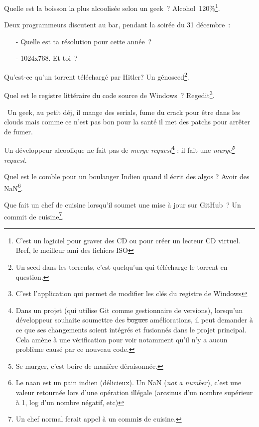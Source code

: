 \documentclass[10pt,a5paper,fullpage]{book}
\begin{document}
\begin{enumerate}
{		\item Quelle est la boisson la plus alcoolisée selon un geek~? Alcohol~120\%\footnote{C’est un logiciel pour graver des CD ou pour créer un lecteur CD virtuel. \\Bref, le meilleur ami des fichiers ISO}.
		\item Deux programmeurs discutent au bar, pendant la soirée du 31 décembre~:
		\begin{itemize}
			\item[-] Quelle est ta résolution pour cette année~?
			\item[-] 1024x768. Et toi~?
		\end{itemize}
		\item Qu'est-ce qu'un torrent téléchargé par Hitler? Un génoseed\footnote{Un seed dans les torrents, c’est quelqu’un qui télécharge le torrent en question.}.
		\item Quel est le registre littéraire du code source de Windows~? Regedit\footnote{C'est l'application qui permet de modifier les clés du registre de Windows}.
		\item \guillemotleft~Un geek, au petit déj, il mange des serials, fume du crack pour être dans les clouds mais comme ce n’est pas bon pour la santé il met des patchs pour arrêter de fumer.~
		\item Un développeur alcoolique ne fait pas de \textit{merge request}\footnote{Dans un projet (qui utilise Git comme gestionnaire de versions), lorsqu'un développeur souhaite soumettre des \sout{bogues} améliorations, il peut demander à ce que ses changements soient intégrés et fusionnés dans le projet principal. Cela amène à une vérification pour voir notamment qu'il n'y a aucun problème causé par ce nouveau code.} : il fait une \textit{murge\footnote{Se murger, c'est boire de manière déraisonnée.} request}.
		\item Quel est le comble pour un boulanger Indien quand il écrit des algos ? Avoir des NaN\footnote{Le naan est un pain indien (délicieux). Un NaN (\textit{not a number}), c'est une valeur retournée lors d'une opération illégale (arcsinus d'un nombre supérieur à 1, log d'un nombre négatif, etc)}.
		\item Que fait un chef de cuisine lorsqu'il soumet une mise à jour sur GitHub~? Un commit de cuisine\footnote{Un chef normal ferait appel à un commi\textbf{s} de cuisine.}. %
		}
	\end{enumerate}
	
\end{document}
